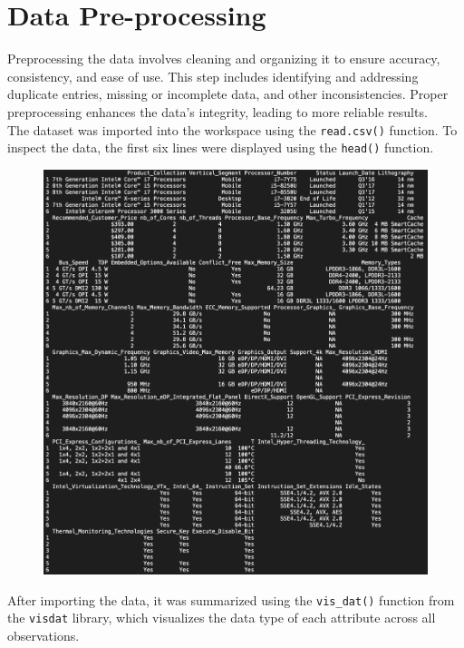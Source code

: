 \section{Data Pre-processing}
Preprocessing the data involves cleaning and organizing it to ensure accuracy, consistency, and ease of use. This step includes identifying and addressing duplicate entries, missing or incomplete data, and other inconsistencies. Proper preprocessing enhances the data's integrity, leading to more reliable results.\\

The dataset was imported into the workspace using the \texttt{read.csv()} function. To inspect the data, the first six lines were displayed using the \texttt{head()} function.\\

\begin{figure}[H]
    \begin{center}
    \includegraphics[width=14cm]{graphics/head.png}
    \end{center}
\end{figure}

After importing the data, it was summarized using the \texttt{vis\_dat()} function from the \texttt{visdat} library, which visualizes the data type of each attribute across all observations.

